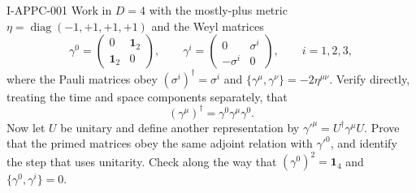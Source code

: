 \begin{exercise}{I-APPC-001}
Work in $D=4$ with the mostly-plus metric
$\eta=\operatorname{diag}(-1,+1,+1,+1)$ and the
Weyl matrices
\[
 \gamma^0=\begin{pmatrix}0&\mathbf 1_2\\ \mathbf 1_2&0\end{pmatrix},
 \qquad
\gamma^i=\begin{pmatrix}0&\sigma^i\\ -\sigma^i&0\end{pmatrix},
\qquad i=1,2,3,
\]
where the Pauli matrices obey $(\sigma^i)^\dagger=\sigma^i$ and
$\{\gamma^\mu,\gamma^\nu\}=-2\eta^{\mu\nu}$. Verify
directly, treating the time and space components separately, that
\[
 (\gamma^\mu)^\dagger=\gamma^0\gamma^\mu\gamma^0.
\]
Now let $U$ be unitary and define another representation by
$\gamma'^\mu=U^\dagger\gamma^\mu U$.  Prove that the primed matrices obey
the same adjoint relation with $\gamma'^0$, and identify the step that uses
unitarity.  Check along the way that $(\gamma^0)^2=\mathbf 1_4$ and
$\{\gamma^0,\gamma^i\}=0$.
\end{exercise}

